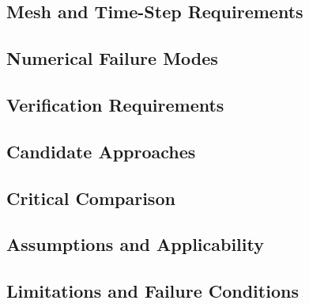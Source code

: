 
\subsection{Mesh and Time-Step Requirements}
\label{sec:res-num-wet-mesh-time-step-requirements}


\subsection{Numerical Failure Modes}
\label{sec:res-num-wet-numerical-failure-modes}


\subsection{Verification Requirements}
\label{sec:res-num-wet-verification-requirements}


\subsection{Candidate Approaches}
\label{sec:res-num-wet-candidate-approaches}


\subsection{Critical Comparison}
\label{sec:res-num-wet-critical-comparison}


\subsection{Assumptions and Applicability}
\label{sec:res-num-wet-assumptions}


\subsection{Limitations and Failure Conditions}
\label{sec:res-num-wet-limitations}


